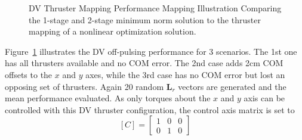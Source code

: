 \documentclass[]{BasiliskReportMemo}
\begin{document}
\begin{figure}[t]
	\centering
	\caption{DV Thruster Mapping Performance Mapping Illustration Comparing the 1-stage and 2-stage minimum norm solution to the thruster mapping of a nonlinear optimization solution.}
	\label{fig:minTorqueDV}
\end{figure}

Figure~\ref{fig:minTorqueDV} illustrates the DV off-pulsing performance for 3 scenarios.  The 1st one has all thrusters available and no COM error.  The 2nd case adds 2cm COM offsets to the $x$ and $y$ axes, while the 3rd case has no COM error but lost an opposing set of thrusters.  Again 20 random $\bm L_{r}$ vectors are generated and the mean performance evaluated.  As only torques about the $x$ and $y$ axis can be controlled with this DV thruster configuration, the control axis matrix is set to 
$$
	[C] = \begin{bmatrix}
		1 & 0 & 0 \\
		0 & 1 & 0
	\end{bmatrix}
$$
\end{document}
